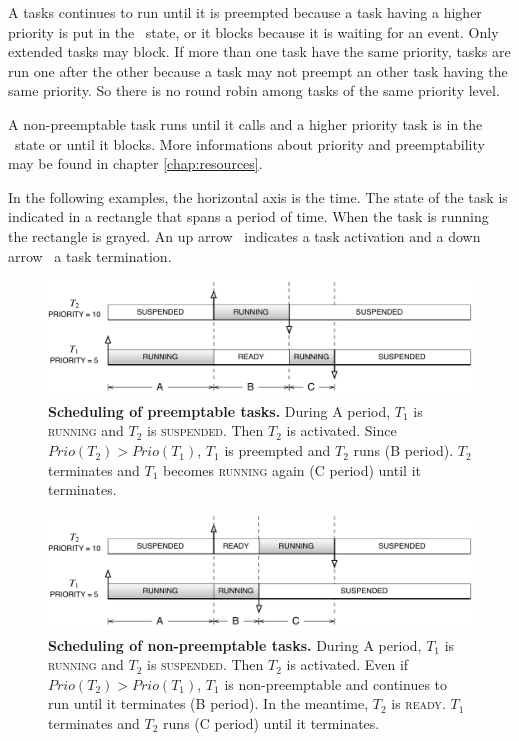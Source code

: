 A tasks continues to run until it is preempted because a task having a higher priority is put in the \READY\ state,  or it blocks because it is waiting for an event. Only extended tasks may block. If more than one task have the same priority, tasks are run one after the other because a task may not preempt an other task having the same priority. So there is no round robin among tasks of the same priority level.

A non-preemptable task runs until it calls  and a higher priority task is in the \READY\ state or until it blocks. More informations about priority and preemptability may be found in chapter \ref{chap:resources}.

In the following examples, the horizontal axis is the time.  The state of the task is indicated in a rectangle that spans a period of time. When the task is running the rectangle is grayed. An up arrow \activate\ indicates a task activation and a down arrow \terminate\ a task termination.

\begin{figure}[htbp] %
   \centering
   \includegraphics[scale=.7]{pictures/schedulingPreempt.pdf} 
   \caption{{\bfseries Scheduling of preemptable tasks.} During A period, $T_1$ is {\sffamily\scshape running} and $T_2$ is {\sffamily\scshape suspended}. Then $T_2$ is activated. Since $Prio(T_2) > Prio(T_1)$, $T_1$ is preempted and $T_2$ runs (B period). $T_2$ terminates and $T_1$ becomes {\sffamily\scshape running} again (C period) until it terminates.}
   \label{fig:schedulePreempt}
\end{figure} 

\begin{figure}[htbp] %
   \centering
   \includegraphics[scale=.7]{pictures/schedulingNonPreempt.pdf} 
   \caption{{\bfseries Scheduling of non-preemptable tasks.} During A period, $T_1$ is {\sffamily\scshape running} and $T_2$ is {\sffamily\scshape suspended}. Then $T_2$ is activated. Even if $Prio(T_2) > Prio(T_1)$, $T_1$ is non-preemptable and continues to run until it terminates (B period). In the meantime, $T_2$ is {\sffamily\scshape ready}. $T_1$ terminates and $T_2$ runs (C period) until it terminates.}
   \label{fig:schedulePreempt}
\end{figure} 

